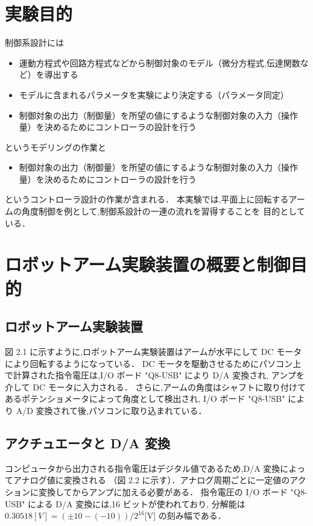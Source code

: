 
\section{実験目的}
制御系設計には
\begin{itemize}
  \item 運動方程式や回路方程式などから制御対象のモデル（微分方程式,伝達関数など）を導出する
  \item モデルに含まれるパラメータを実験により決定する（パラメータ同定）
  \item 制御対象の出力（制御量）を所望の値にするような制御対象の入力（操作量）を決めるためにコントローラの設計を行う
\end{itemize}
というモデリングの作業と
\begin{itemize}
  \item 制御対象の出力（制御量）を所望の値にするような制御対象の入力（操作量）を決めるためにコントローラの設計を行う
\end{itemize}
というコントローラ設計の作業が含まれる．
本実験では,平面上に回転するアームの角度制御を例として,制御系設計の一連の流れを習得することを
目的としている．

\section{ロボットアーム実験装置の概要と制御目的}

\subsection{ロボットアーム実験装置}

図 2.1 に示すように,ロボットアーム実験装置はアームが水平にして DC モータにより回転するようになっている．
DC モータを駆動させるためにパソコン上で計算された指令電圧は,I/O ボード "Q8-USB" により D/A 変換され,
アンプを介して DC モータに入力される．
さらに,アームの角度はシャフトに取り付けてあるポテンショメータによって角度として検出され,
I/O ボード "Q8-USB" により A/D 変換されて後,パソコンに取り込まれている．

\subsection{アクチュエータと D/A 変換}

コンピュータから出力される指令電圧はデジタル値であるため,D/A 変換によってアナログ値に変換される
（図 2.2 に示す）．アナログ周期ごとに一定値のアクションに変換してからアンプに加える必要がある．
指令電圧の I/O ボード "Q8-USB" による D/A 変換には,16 ビットが使われており,
分解能は \(0.30518 [V] = (\pm 10 - (-10))/2^{16} \)[V] の刻み幅である．

